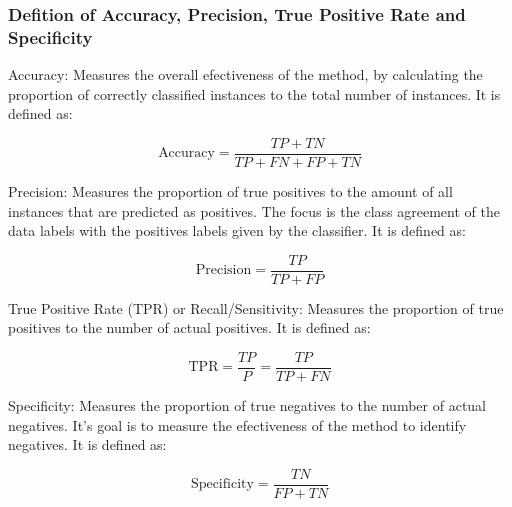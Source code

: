 \subsubsection{Defition of Accuracy, Precision, True Positive Rate and Specificity}
\enumerate

    \item Accuracy: Measures the overall efectiveness of the method, by calculating the proportion of correctly classified instances to the total number of instances.
    It is defined as:
    
    \begin{equation}
        \text{Accuracy} = \frac{TP + TN}{TP + FN + FP + TN}
    \end{equation}

    \item Precision: Measures the proportion of true positives to the amount of all instances that are predicted as positives.
    The focus is the class agreement of the data labels with the positives labels given by the classifier.
    It is defined as: 

    \begin{equation}
        \text{Precision} = \frac{TP}{TP + FP}
    \end{equation}

    \item True Positive Rate (TPR) or Recall/Sensitivity: Measures the proportion of true positives to the number of actual positives.
    It is defined as: 

    \begin{equation}
        \text{TPR} = \frac{TP}{P} = \frac{TP}{TP + FN}
    \end{equation}

    \item Specificity: Measures the proportion of true negatives to the number of actual negatives.
    It's goal is to measure the efectiveness of the method to identify negatives.
    It is defined as:

    \begin{equation}
        \text{Specificity} = \frac{TN}{FP + TN}
    \end{equation}
\citep[p.430]{sokolova2009systematic}
\endenumerate
{}



